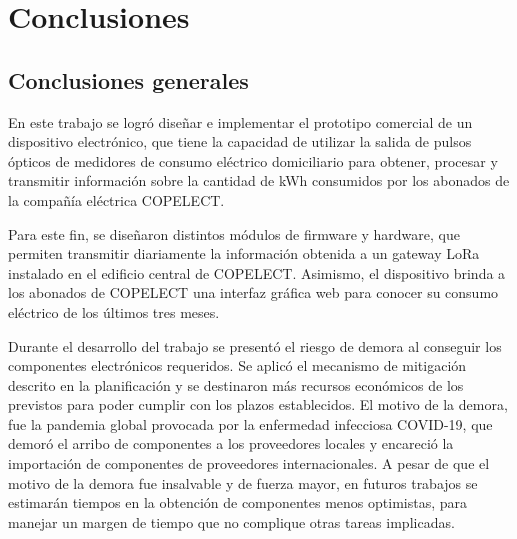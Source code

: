 
\chapter{Conclusiones} %

\label{Chapter5} %




\section{Conclusiones generales }

En este trabajo se logró diseñar e implementar el prototipo comercial de un dispositivo electrónico, que tiene la capacidad de utilizar la salida de pulsos ópticos de medidores de consumo eléctrico domiciliario para obtener, procesar y transmitir información sobre la cantidad de kWh consumidos por los abonados de la compañía eléctrica COPELECT.

Para este fin, se diseñaron distintos módulos de firmware y hardware, que permiten transmitir diariamente la información obtenida a un gateway LoRa instalado en el edificio central de COPELECT. Asimismo, el dispositivo brinda a los abonados de COPELECT una interfaz gráfica web para conocer su consumo eléctrico de los últimos tres meses.

Durante el desarrollo del trabajo se presentó el riesgo de demora al conseguir los componentes electrónicos requeridos. Se aplicó el mecanismo de mitigación descrito en la planificación y se destinaron más recursos económicos de los previstos para poder cumplir con los plazos establecidos. El motivo de la demora, fue la pandemia global provocada por la enfermedad infecciosa COVID-19, que demoró el arribo de componentes a los proveedores locales y encareció la importación de componentes de proveedores internacionales. A pesar de que el motivo de la demora fue insalvable y de fuerza mayor, en futuros trabajos se estimarán tiempos en la obtención de componentes menos optimistas, para manejar un margen de tiempo que no complique otras tareas implicadas.

